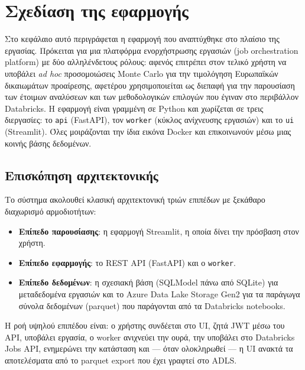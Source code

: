 \documentclass[12pt]{article}
\begin{document}
\newpage

\section{Σχεδίαση της εφαρμογής}

Στο κεφάλαιο αυτό περιγράφεται η εφαρμογή που αναπτύχθηκε στο πλαίσιο της εργασίας. Πρόκειται για μια πλατφόρμα ενορχήστρωσης εργασιών (job orchestration platform) με δύο αλληλένδετους ρόλους: αφενός επιτρέπει στον τελικό χρήστη να υποβάλει \emph{ad hoc} προσομοιώσεις Monte Carlo για την τιμολόγηση Ευρωπαϊκών δικαιωμάτων προαίρεσης, αφετέρου χρησιμοποιείται ως διεπαφή για την παρουσίαση των έτοιμων αναλύσεων και των μεθοδολογικών επιλογών που έγιναν στο περιβάλλον Databricks. Η εφαρμογή είναι γραμμένη σε Python και χωρίζεται σε τρεις διεργασίες: το \texttt{api} (FastAPI), τον \texttt{worker} (κύκλος ανίχνευσης εργασιών) και το \texttt{ui} (Streamlit). Όλες μοιράζονται την ίδια εικόνα Docker και επικοινωνούν μέσω μιας κοινής βάσης δεδομένων.

\subsection{Επισκόπηση αρχιτεκτονικής}
Το σύστημα ακολουθεί κλασική αρχιτεκτονική τριών επιπέδων με ξεκάθαρο διαχωρισμό αρμοδιοτήτων:
\begin{itemize}
  \item \textbf{Επίπεδο παρουσίασης}: η εφαρμογή Streamlit, η οποία δίνει την πρόσβαση στον χρήστη.
  \item \textbf{Επίπεδο εφαρμογής}: το REST API (FastAPI) και ο \texttt{worker}.
  \item \textbf{Επίπεδο δεδομένων}: η σχεσιακή βάση (SQLModel πάνω από SQLite) για μεταδεδομένα εργασιών και το Azure Data Lake Storage Gen2 για τα παράγωγα σύνολα δεδομένων (parquet) που παράγονται από τα Databricks notebooks.
\end{itemize}

Η ροή υψηλού επιπέδου είναι: ο χρήστης συνδέεται στο UI, ζητά JWT μέσω του API, υποβάλει εργασία, ο worker ανιχνεύει την ουρά, την υποβάλει στο Databricks Jobs API, ενημερώνει την κατάσταση και — όταν ολοκληρωθεί — η UI ανακτά τα αποτελέσματα από το parquet export που έχει γραφτεί στο ADLS.
\end{document}
